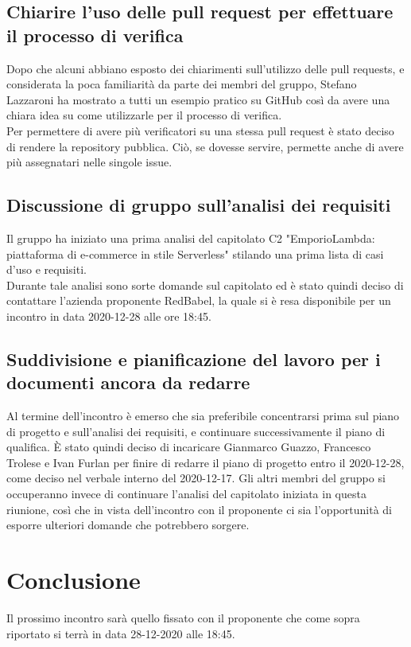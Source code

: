 \subsection{Chiarire l'uso delle pull request per effettuare il processo di verifica}
Dopo che alcuni abbiano esposto dei chiarimenti sull'utilizzo delle pull requests, e considerata la poca familiarità da parte dei membri del gruppo, Stefano Lazzaroni ha mostrato a tutti un esempio pratico su GitHub così da avere una chiara idea su come utilizzarle per il processo di verifica.\\
Per permettere di avere più verificatori su una stessa pull request è stato deciso di rendere la repository pubblica. Ciò, se dovesse servire, permette anche di avere più assegnatari nelle singole issue.

\subsection{Discussione di gruppo sull'analisi dei requisiti}
Il gruppo ha iniziato una prima analisi del capitolato C2 "EmporioLambda: piattaforma di e-commerce in stile Serverless" stilando una prima lista di casi d'uso e requisiti.\\
Durante tale analisi sono sorte domande sul capitolato ed è stato quindi deciso di contattare l'azienda proponente RedBabel, la quale si è resa disponibile per un incontro in data 2020-12-28 alle ore 18:45.

\subsection{Suddivisione e pianificazione del lavoro per i documenti ancora da redarre} 
Al termine dell'incontro è emerso che sia preferibile concentrarsi prima sul piano di progetto e sull'analisi dei requisiti, e continuare successivamente il piano di qualifica.
È stato quindi deciso di incaricare Gianmarco Guazzo, Francesco Trolese e Ivan Furlan per finire di redarre il piano di progetto entro il 2020-12-28, come deciso nel verbale interno del 2020-12-17. Gli altri membri del gruppo si occuperanno invece di continuare l'analisi del capitolato iniziata in questa riunione, così che in vista dell'incontro con il proponente ci sia l'opportunità di esporre ulteriori domande che potrebbero sorgere.

\section{Conclusione}
Il prossimo incontro sarà quello fissato con il proponente che come sopra riportato si terrà in data 28-12-2020 alle 18:45.

